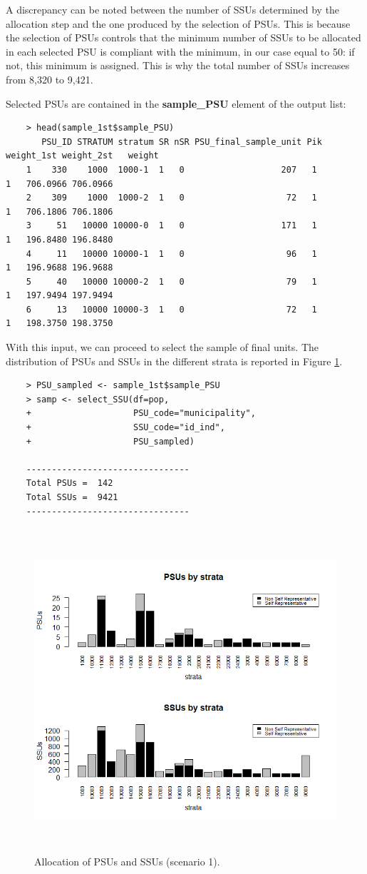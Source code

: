 A discrepancy can be noted between the number of SSUs determined by the allocation step and the one produced by the selection of PSUs. This is because the selection of PSUs controls that the minimum number of SSUs to be allocated in each selected PSU is compliant with the minimum, in our case equal to 50: if not, this minimum is assigned. This is why the total number of SSUs increases from 8,320 to 9,421.

Selected PSUs are contained in the \textbf{sample\_PSU} element of the output list:
\begin{verbatim}
	> head(sample_1st$sample_PSU)
	   PSU_ID STRATUM stratum SR nSR PSU_final_sample_unit Pik weight_1st weight_2st   weight
	1    330    1000  1000-1  1   0                   207   1          1   706.0966 706.0966
	2    309    1000  1000-2  1   0                    72   1          1   706.1806 706.1806
	3     51   10000 10000-0  1   0                   171   1          1   196.8480 196.8480
	4     11   10000 10000-1  1   0                    96   1          1   196.9688 196.9688
	5     40   10000 10000-2  1   0                    79   1          1   197.9494 197.9494
	6     13   10000 10000-3  1   0                    72   1          1   198.3750 198.3750
\end{verbatim}
With this input, we can proceed to select the sample of final units. 
The distribution of PSUs and SSUs in the different strata is reported in Figure \ref{alloca1}. 
\begin{verbatim}
	> PSU_sampled <- sample_1st$sample_PSU
	> samp <- select_SSU(df=pop,
	+                    PSU_code="municipality",
	+                    SSU_code="id_ind",
	+                    PSU_sampled)
	
	--------------------------------
	Total PSUs =  142
	Total SSUs =  9421
	--------------------------------
\end{verbatim}

\begin{figure} [h!]
	\centering
	\includegraphics[width=15cm,height=12cm]{allocation1.png}
	\caption{Allocation of PSUs and SSUs (scenario 1).}
	\label{alloca1}
\end{figure}

